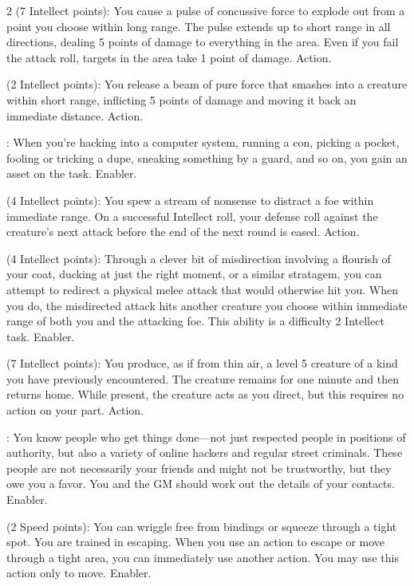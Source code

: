 \begin{multicols}{2}
 (7 Intellect points): You cause a pulse of concussive force to explode out from a point you choose within long range. The pulse extends up to short range in all directions, dealing 5 points of damage to everything in the area. Even if you fail the attack roll, targets in the area take 1 point of damage. Action. 

 (2 Intellect points): You release a beam of pure force that smashes into a creature within short range, inflicting 5 points of damage and moving it back an immediate distance. Action. 

: When you’re hacking into a computer system, running a con, picking a pocket, fooling or tricking a dupe, sneaking something by a guard, and so on, you gain an asset on the task. Enabler. 

 (4 Intellect points): You spew a stream of nonsense to distract a foe within immediate range. On a successful Intellect roll, your defense roll against the creature’s next attack before the end of the next round is eased. Action. 

 (4 Intellect points): Through a clever bit of misdirection involving a flourish of your coat, ducking at just the right moment, or a similar stratagem, you can attempt to redirect a physical melee attack that would otherwise hit you. When you do, the misdirected attack hits another creature you choose within immediate range of both you and the attacking foe. This ability is a difficulty 2 Intellect task. Enabler. 

 (7 Intellect points): You produce, as if from thin air, a level 5 creature of a kind you have previously encountered. The creature remains for one minute and then returns home. While present, the creature acts as you direct, but this requires no action on your part. Action. 

: You know people who get things done—not just respected people in positions of authority, but also a variety of online hackers and regular street criminals. These people are not necessarily your friends and might not be trustworthy, but they owe you a favor. You and the GM should work out the details of your contacts. Enabler.

 (2 Speed points): You can wriggle free from bindings or squeeze through a tight spot. You are trained in escaping. When you use an action to escape or move through a tight area, you can immediately use another action. You may use this action only to move. Enabler. 


\end{multicols}
